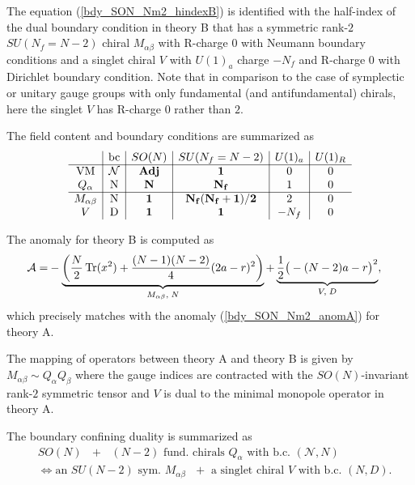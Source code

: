 \documentclass[12pt]{article}
\newcommand{\Acal}{\mathcal{A}}
\DeclareMathOperator*{\Tr}{{\rm Tr}}
\numberwithin{equation}{section}
\begin{document}
The equation (\ref{bdy_SON_Nm2_hindexB}) is identified with the half-index of the dual boundary condition in theory B 
that has a symmetric rank-$2$ $SU(N_f = N - 2)$ chiral $M_{\alpha\beta}$ with R-charge $0$
with Neumann boundary conditions and
a singlet chiral $V$ with $U(1)_a$ charge $-N_f$
and R-charge $0$ with Dirichlet boundary condition. Note that in comparison to the case of symplectic or unitary gauge groups with only fundamental (and antifundamental) chirals, here the singlet $V$ has R-charge $0$ rather than $2$. 

The field content and boundary conditions are summarized as
\begin{align}
\label{SON_Nm2_charges}
\begin{array}{c|c|c|c|c|c}
& \textrm{bc} & SO(N) & SU(N_f = N - 2) & U(1)_a & U(1)_R \\ \hline
\textrm{VM} & \mathcal{N} & {\bf Adj} & {\bf 1} & 0 & 0 \\
Q_{\alpha} & \textrm{N} & {\bf N} & {\bf N_f} & 1 & 0 \\
 \hline
M_{\alpha \beta} & \textrm{N} & {\bf 1} & {\bf N_f(N_f + 1)/2} & 2 & 0 \\
V & \textrm{D} & {\bf 1} & {\bf 1} & -N_f & 0
\end{array}
\end{align}

The anomaly for theory B is computed as
\begin{align}
\label{bdy_SON_Nm2_anomB}
\Acal  = & - \underbrace{\left( \frac{N}{2} \Tr(x^2) + \frac{(N-1)(N-2)}{4}(2a-r)^2 \right)}_{M_{\alpha \beta}, \; N}
   + \underbrace{\frac{1}{2}\big( -(N-2)a - r \big)^2}_{V, \; D}, 
\end{align}
which precisely matches with the anomaly (\ref{bdy_SON_Nm2_anomA}) for theory A. 

The mapping of operators between theory A and theory B is given by
$M_{\alpha \beta} \sim Q_{\alpha} Q_{\beta}$ where the gauge indices are contracted with the $SO(N)$-invariant rank-$2$ symmetric tensor and $V$ is dual to the minimal monopole operator in theory A.

The boundary confining duality is summarized as
\begin{align}
\label{bdy_SON_Nm2_dual}
&\textrm{$SO(N)$ $+$ $(N-2)$ fund. chirals $Q_{\alpha}$ with b.c. $(\mathcal{N},N)$}
\nonumber\\
&\Leftrightarrow 
\textrm{
an $SU(N-2)$ sym. $M_{\alpha\beta}$ $+$ 
a singlet chiral $V$ with b.c. $(N,D)$}. 
\end{align}
\end{document}
